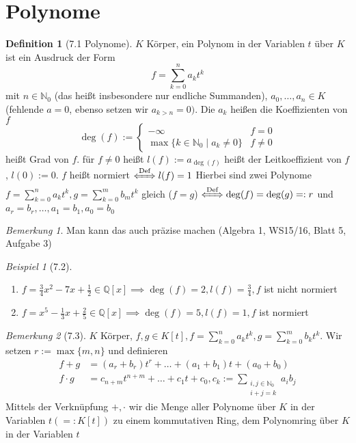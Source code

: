 \documentclass[a4paper]{scrartcl}
\theoremstyle{definition}
\newtheorem{defn}{Definition}
\theoremstyle{plain}
\theoremstyle{plain}
\theoremstyle{remark}
\newtheorem{remark}{Bemerkung}
\theoremstyle{remark}
\theoremstyle{remark}
\theoremstyle{remark}
\theoremstyle{remark}
\newtheorem{ex}{Beispiel}
\begin{document}
\section{Polynome}
\label{sec-4}
\begin{defn}[7.1 Polynome]
$K$ Körper, ein Polynom in der Variablen $t$ über $K$ ist ein Ausdruck der Form
\[f = \sum_{k = 0}^n a_k t^k\]
mit $n\in\mathbb{N}_0$ (das heißt insbesondere nur endliche Summanden), $a_0,\ldots,a_n \in K$ (fehlende $a = 0$, ebenso setzen wir $a_{k > n} = 0)$. Die $a_k$ heißen die Koeffizienten von $f$
\[\deg(f) := \begin{cases}-\infty & f = 0 \\  \max\{k\in\mathbb{N}_0 \mid a_k \neq 0\} & f\neq 0\end{cases}\]
heißt Grad von $f$. für $f\neq 0$ heißt $l(f) := a_{\deg(f)}$ heißt der Leitkoeffizient von $f$, $l(0) := 0$. $f$ heißt normiert $\xLeftrightarrow{\text{Def}} l(f) = 1$
Hierbei sind zwei Polynome $f = \sum_{k = 0}^n a_k t^k,g = \sum_{k =0}^m b_m t^k$ gleich ($f = g$) $\xLeftrightarrow{\text{Def}} \deg(f) = \deg(g) =: r$ und $a_r = b_r,\ldots,a_1 = b_1, a_0 = b_0$
\end{defn}
\begin{remark}
Man kann das auch präzise machen (Algebra 1, WS15/16, Blatt 5, Aufgabe 3)
\end{remark}
\begin{ex}[7.2] \mbox{}
\begin{enumerate}
\item $f = \frac{3}{4}x^2 - 7 x + \frac{1}{2} \in \mathbb{Q}[x] \implies \deg(f) = 2, l(f) = \frac{3}{4}, f$ ist nicht normiert
\item $f = x^5 - \frac{1}{3} x + \frac{2}{5} \in\mathbb{Q}[x] \implies \deg(f) = 5, l(f) = 1, f$ ist normiert
\end{enumerate}
\end{ex}
\begin{remark}[7.3]
$K$ Körper, $f,g \in K[t], f = \sum_{k = 0}^n a_k t^k, g = \sum_{k = 0}^m b_k t^k$. Wir setzen $r:= \max\{m,n\}$ und definieren
\begin{align*}
f + g &= (a_r + b_r)t^r + \ldots + (a_1 + b_1)t + (a_0 + b_0) \\
f \cdot g &= c_{n + m} t^{n + m} + \ldots + c_1 t + c_0, c_k := \sum_{\substack{i,j \in\mathbb{N}_0 \\ i + j = k}} a_i b_j
\end{align*}
Mittels der Verknüpfung $+,\cdot$ wir die Menge aller Polynome über $K$ in der Variablen $t (=: K[t])$ zu einem kommutativen Ring, dem Polynomring über $K$ in der Variablen $t$
\end{remark}
\end{document}
